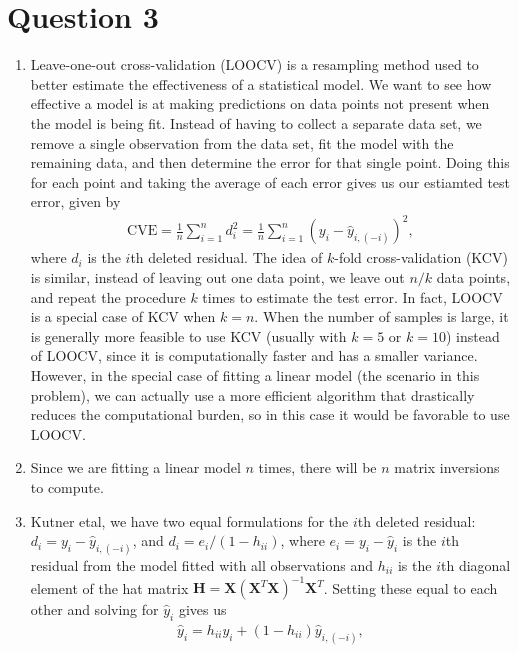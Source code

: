 \documentclass[10pt]{article}
\begin{document}
\section{Question 3} \noindent
\begin{enumerate}
    \item Leave-one-out cross-validation (LOOCV) is a resampling method used to better estimate the effectiveness of a statistical model. 
    We want to see how effective a model is at making predictions on data points not present when the model is being fit. Instead of having to 
    collect a separate data set, we remove a single observation from the data set, fit the model with the remaining data, and then determine the error for 
    that single point. Doing this for each point and taking the average of each error gives us our estiamted test error, given by 
    \begin{align*}
        \mathrm{CVE}
        = \frac{1}{n} \sum_{i=1}^n d_i^2
        = \frac{1}{n} \sum_{i=1}^n (y_i - \hat{y}_{i,(-i)})^2,
    \end{align*}
    where \(d_i\) is the \(i\)th deleted residual. 
    The idea of \(k\)-fold cross-validation (KCV) is similar, instead of leaving out one data point, we leave out \(n / k\) data points, and repeat the procedure
    \(k\) times to estimate the test error. In fact, LOOCV is a special case of KCV when \(k = n\). When the number of samples is large, it is generally 
    more feasible to use KCV (usually with \(k = 5\) or \(k = 10\)) instead of LOOCV, since it is computationally faster and has a smaller variance. 
    However, in the special case of fitting a linear model (the scenario in this problem), we can actually use a more efficient algorithm that drastically 
    reduces the computational burden, so in this case it would be favorable to use LOOCV. 
    \item Since we are fitting a linear model \(n\) times, there will be \(n\) matrix inversions to compute.
    \item Kutner etal, we have two equal formulations for the \(i\)th deleted residual: \(d_i = y_i - \hat{y}_{i,(-i)}\), and 
    \(d_i = e_i / (1 - h_{ii})\), where \(e_i = y_i - \hat{y}_i\) is the \(i\)th residual from the model fitted with all observations and 
    \(h_{ii}\) is the \(i\)th diagonal element of the hat matrix \(\mathbf{H} = \mathbf{X}(\mathbf{X}^T\mathbf{X})^{-1}\mathbf{X}^T\). 
    Setting these equal to each other and solving for \(\hat{y}_i\) gives us 
    \begin{align}
        \hat{y}_i = h_{ii} y_i + (1 - h_{ii})\hat{y}_{i,(-i)},

\end{align}
\end{enumerate}
\end{document}

